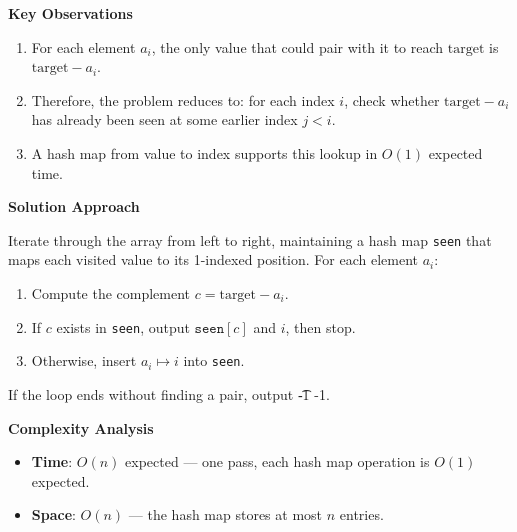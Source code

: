 \textbf{Key Observations}

\begin{enumerate}
    \item For each element $a_i$, the only value that could pair with it to reach $\text{target}$ is $\text{target} - a_i$.
    \item Therefore, the problem reduces to: for each index $i$, check whether $\text{target} - a_i$ has already been seen at some earlier index $j < i$.
    \item A hash map from value to index supports this lookup in $O(1)$ expected time.
\end{enumerate}

\textbf{Solution Approach}

Iterate through the array from left to right, maintaining a hash map \texttt{seen} that maps each visited value to its 1-indexed position. For each element $a_i$:
\begin{enumerate}
    \item Compute the complement $c = \text{target} - a_i$.
    \item If $c$ exists in \texttt{seen}, output $\texttt{seen}[c]$ and $i$, then stop.
    \item Otherwise, insert $a_i \mapsto i$ into \texttt{seen}.
\end{enumerate}
If the loop ends without finding a pair, output \t{-1 -1}.

\textbf{Complexity Analysis}

\begin{itemize}
    \item \textbf{Time}: $O(n)$ expected --- one pass, each hash map operation is $O(1)$ expected.
    \item \textbf{Space}: $O(n)$ --- the hash map stores at most $n$ entries.
\end{itemize}
